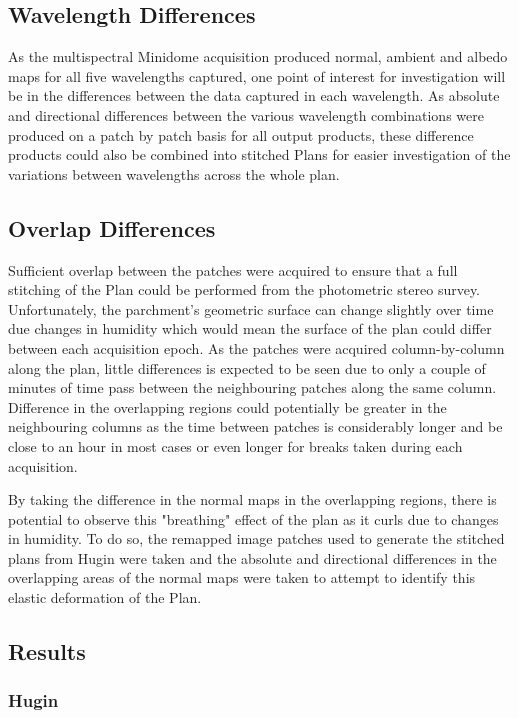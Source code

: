 \subsection{Wavelength Differences}
As the multispectral Minidome acquisition produced normal, ambient and albedo maps for all five wavelengths captured, one point of interest for investigation will be in the differences between the data captured in each wavelength. As absolute and directional differences between the various wavelength combinations were produced on a patch by patch basis for all output products, these difference products could also be combined into stitched Plans for easier investigation of the variations between wavelengths across the whole plan.

\subsection{Overlap Differences}
Sufficient overlap between the patches were acquired to ensure that a full stitching of the Plan could be performed from the photometric stereo survey. Unfortunately, the parchment's geometric surface can change slightly over time due changes
in humidity which would mean the surface of the plan could differ between each acquisition epoch. As the patches were acquired column-by-column along the plan, little differences is expected to be seen due to only a couple of minutes of time pass between the neighbouring patches along the same column. Difference in the overlapping regions could potentially be greater in the neighbouring columns as the time between patches is considerably longer and be close to an hour in most cases or even longer for breaks taken during each acquisition.

By taking the difference in the normal maps in the overlapping regions, there is potential to observe this "breathing" effect of the plan as it curls due to changes in humidity. To do so, the remapped image patches used to generate the stitched plans from Hugin were taken and the absolute and directional differences in the overlapping areas of the normal maps were taken to attempt to identify this elastic deformation of the Plan.

\subsection{Results}
\label{sec:ResultsStitching}

\subsubsection{Hugin}

